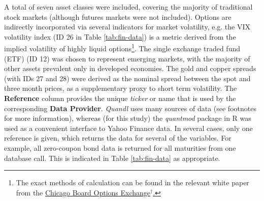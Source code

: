 \documentclass{article}
\begin{document}
A total of seven asset classes were included, covering the majority of traditional stock markets (although futures markets were not included). Options are indirectly incorporated via several indicators for market volatility, e.g. the VIX volatility index (ID 26 in Table \ref{tab:fin-data}) is a metric derived from the implied volatility of highly liquid options\footnote{The exact methods of calculation can be found in the relevant white paper from the \href{https://www.cboe.com/micro/vix/vixwhite.pdf}{Chicago Board Options Exchange$^{\dag{}}$.}}. The single exchange traded fund (ETF) (ID 12) was chosen to represent emerging markets, with the majority of other assets prevalent only in developed economies. The gold and copper spreads (with IDs 27 and 28) were derived as the nominal spread between the spot and three month prices, as a supplementary proxy to short term volatility. The \textbf{Reference} column provides the unique \emph{ticker} or name that is used by the corresponding \textbf{Data Provider}. \emph{Quandl} uses many sources of data (see footnotes for more information), whereas (for this study) the \emph{quantmod} package in R was used as a convenient interface to Yahoo Finance data. In several cases, only one reference is given, which returns the data for several of the variables. For example, all zero-coupon bond data is returned for all maturities from one database call. This is indicated in Table \ref{tab:fin-data} as appropriate.
\end{document}
